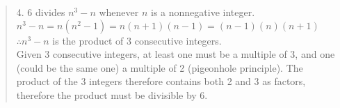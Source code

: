 \documentclass[12pt]{article}
\newenvironment{problem}[2][Problem]{\begin{trivlist}
\item[\hskip \labelsep {\bfseries #1}\hskip \labelsep {\bfseries #2.}]}{\end{trivlist}}
\begin{document}
\begin{problem}{6}
\begin{quote}
        4. 6 divides $n^3 - n$ whenever $n$ is a nonnegative integer.\\
        $n^3 - n = n(n^2-1) = n(n+1)(n-1) = (n-1)(n)(n+1)$\\
        $ \therefore n^3 - n$ is the product of 3 consecutive integers.\\
        Given 3 consecutive integers, at least one must be a multiple of 3, and one (could be the same one) a multiple of 2 (pigeonhole principle).
        The product of the 3 integers therefore contains both 2 and 3 as factors, therefore the product must be divisible by 6.\\

    \end{quote}
\end{problem}
 
\end{document}
